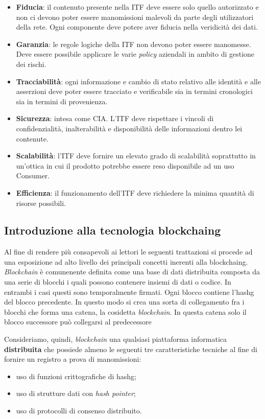 \begin{itemize}
    \item \textbf{Fiducia}: il contenuto presente nella ITF deve essere solo quello autorizzato e non ci devono poter essere manomissioni malevoli da parte degli utilizzatori della rete. Ogni componente deve potere aver fiducia nella veridicità dei dati.
    \item \textbf{Garanzia}: le regole logiche della ITF non devono poter essere manomesse. Deve essere possibile applicare le varie \textit{policy} aziendali in ambito di gestione dei rischi.
    \item \textbf{Tracciabilità}: ogni informazione e cambio di stato relativo alle identità e alle asserzioni deve poter essere tracciato e verificabile sia in termini cronologici sia in termini di provenienza. 
    \item \textbf{Sicurezza}: intesa come CIA. L’ITF deve rispettare i vincoli di confidenzialità, inalterabilità e disponibilità delle informazioni dentro lei contenute.
    \item \textbf{Scalabilità}: l’ITF deve fornire un elevato grado di scalabilità soprattutto in un’ottica in cui il prodotto potrebbe essere reso disponibile ad un uso Consumer.
    \item \textbf{Efficienza}: il funzionamento dell’ITF deve richiedere la minima quantità di risorse possibili.
\end{itemize}

\subsection{Introduzione alla tecnologia \gls{blockchaing}}
Al fine di rendere più consapevoli ai lettori le seguenti trattazioni si procede ad una esposizione ad alto livello dei principali concetti inerenti alla \gls{blockchaing}.
\emph{Blockchain} è comunenente definita come una base di dati distribuita composta da una serie di blocchi i quali possono contenere insiemi di dati o codice. In entrambi i casi questi sono temporalmente firmati.
Ogni blocco contiene l'\gls{hashg} del blocco precedente. In questo modo si crea una sorta di collegamento fra i blocchi che forma una catena, la cosidetta \emph{blockchain}. In questa catena solo il blocco successore può collegarsi al predecessore

Consideriamo, quindi, \emph{blockchain} una qualsiasi piattaforma informatica \textbf{distribuita} che possiede almeno le seguenti tre caratteristiche tecniche al fine di fornire un registro a prova di manomissioni: 
\begin{itemize}
    \item uso di funzioni crittografiche di \gls{hashg};
    \item uso di strutture dati con \emph{hash pointer};
    \item uso di protocolli di consenso distribuito.
\end{itemize}

